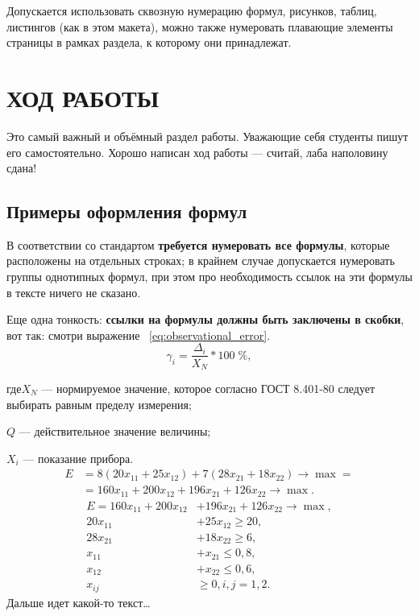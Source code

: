 \documentclass[a4paper,hidelinks,14pt]{extarticle}
\begin{document}
Допускается использовать сквозную нумерацию формул, рисунков, таблиц, листингов (как в этом макета),
можно также нумеровать плавающие элементы страницы в рамках раздела, к которому они принадлежат.

\section{ХОД РАБОТЫ}

Это самый важный и объёмный раздел работы. Уважающие себя студенты пишут его самостоятельно.
Хорошо написан ход работы --- считай, лаба наполовину сдана!

\subsection{Примеры оформления формул}

В соответствии со стандартом \textbf{требуется нумеровать все 
	формулы}, которые расположены на отдельных строках; в крайнем случае допускается нумеровать
группы однотипных формул, при этом про необходимость ссылок на эти формулы в тексте ничего не сказано.

Еще одна тонкость: \textbf{ссылки на формулы должны быть заключены в скобки}, вот так: смотри выражение ~\eqref{eq:observational_error}.
\begin{equation}
	\label{eq:observational_error}
	\gamma_{i} = \dfrac{\Delta_{i}}{X_{N}}*100\;\%,
\end{equation}

\noindent где\hspace{1em}$ X_{N} $ --- нормируемое значение, которое согласно ГОСТ 8.401-80
следует выбирать равным пределу измерения;

$ Q $ --- действительное значение величины;

$ X_{i} $ --- показание прибора.
\begin{equation}
	\label{eq:BaseOpt}
	\begin{aligned}
		E &= 8(20x_{11} + 25x_{12}) + 7(28x_{21} + 18x_{22}) \rightarrow \max = \\
		&= 160x_{11} + 200x_{12} + 196x_{21} + 126x_{22} \rightarrow \max.
	\end{aligned}
\end{equation}
\begin{equation}
	\label{eq:BaseNSM}
	\begin{aligned}
		E = 160x_{11} + 200x_{12} &+ 196x_{21} + 126x_{22} \rightarrow \max, \\
		20x_{11} &+ 25x_{12} \ge 20, \\
		28x_{21} &+ 18x_{22} \ge 6, \\
		x_{11} &+ x_{21} \le 0{,}8, \\
		x_{12} &+ x_{22} \le 0{,}6, \\
		x_{ij} & \ge 0, i, j = 1, 2.
	\end{aligned}
\end{equation}
Дальше идет какой-то текст\dots
\end{document}
